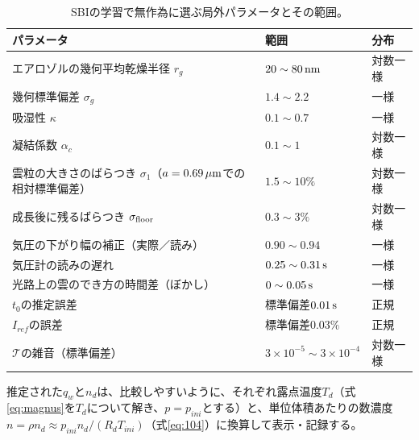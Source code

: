 \documentclass{ltjsarticle}
\begin{document}
\begin{table}[h]
 \begin{center}
 \caption{SBIの学習で無作為に選ぶ局外パラメータとその範囲。}\label{tab:nuisance}
 \begin{tabular}{lll}
 \toprule
 パラメータ & 範囲 & 分布 \\
 \midrule
 エアロゾルの幾何平均乾燥半径 $r_{g}$ & $20\sim80\,\rm nm$ & 対数一様 \\
 幾何標準偏差 $\sigma_{g}$ & $1.4\sim2.2$ & 一様 \\
 吸湿性 $\kappa$ & $0.1\sim0.7$ & 一様 \\
 凝結係数 $\alpha_{c}$ & $0.1\sim1$ & 対数一様 \\
 雲粒の大きさのばらつき $\sigma_{1}$（$a=0.69\,\rm \mu m$での相対標準偏差） & $1.5\sim10\%$ & 対数一様 \\
 成長後に残るばらつき $\sigma_{\rm floor}$ & $0.3\sim3\%$ & 対数一様 \\
 気圧の下がり幅の補正（実際／読み） & $0.90\sim0.94$ & 一様 \\
 気圧計の読みの遅れ & $0.25\sim0.31\,\rm s$ & 一様 \\
 光路上の雲のでき方の時間差（ぼかし） & $0\sim0.05\,\rm s$ & 一様 \\
 $t_{0}$の推定誤差 & 標準偏差$0.01\,\rm s$ & 正規 \\
 $I_{ref}$の誤差 & 標準偏差$0.03\%$ & 正規 \\
 $\mathcal{T}$の雑音（標準偏差） & $3\times10^{-5}\sim3\times10^{-4}$ & 対数一様 \\
 \bottomrule
 \end{tabular}
 \end{center}
\end{table}

推定された$q_{w}$と$n_{d}$は、比較しやすいように、それぞれ露点温度$T_{d}$（式\eqref{eq:magnus}を$T_{d}$について解き、$p=p_{ini}$とする）と、単位体積あたりの数濃度$n=\rho n_{d}\approx p_{ini}n_{d}/(R_{d}T_{ini})$（式\eqref{eq:104}）に換算して表示・記録する。
\end{document}
